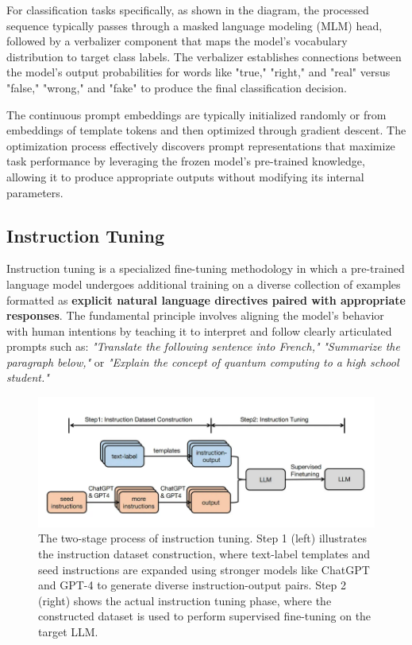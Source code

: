 For classification tasks specifically, as shown in the diagram, the processed sequence typically passes through a masked language modeling (MLM) head, followed by a verbalizer component that maps the model's vocabulary distribution to target class labels. The verbalizer establishes connections between the model's output probabilities for words like "true," "right," and "real" versus "false," "wrong," and "fake" to produce the final classification decision.

The continuous prompt embeddings are typically initialized randomly or from embeddings of template tokens and then optimized through gradient descent. The optimization process effectively discovers prompt representations that maximize task performance by leveraging the frozen model's pre-trained knowledge, allowing it to produce appropriate outputs without modifying its internal parameters.

\subsection{Instruction Tuning}
Instruction tuning is a specialized fine-tuning methodology in which a pre-trained language model undergoes additional training on a diverse collection of examples formatted as \textbf{explicit natural language directives paired with appropriate responses}. The fundamental principle involves aligning the model's behavior with human intentions by teaching it to interpret and follow clearly articulated prompts such as: \textit{"Translate the following sentence into French,"} \textit{"Summarize the paragraph below,"} or \textit{"Explain the concept of quantum computing to a high school student."} 

\begin{figure}[t]
\centering
\includegraphics[width=\linewidth]{img/chap05/5.2.6.png}
\caption{The two-stage process of instruction tuning. Step 1 (left) illustrates the instruction dataset construction, where text-label templates and seed instructions are expanded using stronger models like ChatGPT and GPT-4 to generate diverse instruction-output pairs. Step 2 (right) shows the actual instruction tuning phase, where the constructed dataset is used to perform supervised fine-tuning on the target LLM.}
\label{fig:instruction_tuning}
\end{figure}

